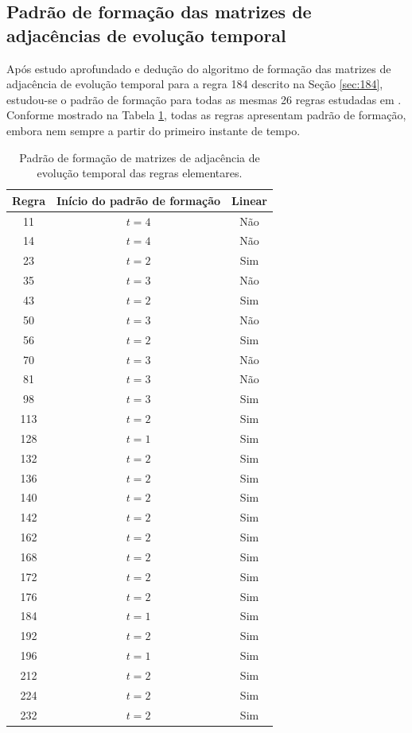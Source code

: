 \documentclass[12pt,a4paper]{article}
\begin{document}
\subsection{Padrão de formação das matrizes de adjacências de evolução temporal}\label{sec:pattern}

Após estudo aprofundado e dedução do algoritmo de formação das matrizes
de adjacência de evolução temporal para a regra 184 descrito na Seção \ref{sec:184},
estudou-se o padrão de formação para todas as mesmas 26 regras estudadas em
. Conforme mostrado na Tabela \ref{tab:pattern},
todas as regras apresentam padrão de formação, embora nem sempre a
partir do primeiro instante de tempo.

\begin{table}[htp]
\begin{center}
\begin{tabular}{c c c}
\hline
\textbf{Regra} & \textbf{Início do padrão de formação} & \textbf{Linear}\\ \hline
 11 & $t=4$ & Não \\
 14 & $t=4$ & Não \\
 23 & $t=2$ & Sim \\
 35 & $t=3$ & Não \\
 43 & $t=2$ & Sim \\
 50 & $t=3$ & Não \\
 56 & $t=2$ & Sim \\
 70 & $t=3$ & Não \\
 81 & $t=3$ & Não \\
 98 & $t=3$ & Sim \\
113 & $t=2$ & Sim \\
128 & $t=1$ & Sim \\
132 & $t=2$ & Sim \\
136 & $t=2$ & Sim \\
140 & $t=2$ & Sim \\
142 & $t=2$ & Sim \\
162 & $t=2$ & Sim \\
168 & $t=2$ & Sim \\
172 & $t=2$ & Sim \\
176 & $t=2$ & Sim \\
184 & $t=1$ & Sim \\
192 & $t=2$ & Sim \\
196 & $t=1$ & Sim \\
212 & $t=2$ & Sim \\
224 & $t=2$ & Sim \\
232 & $t=2$ & Sim \\
\end{tabular}
\caption{Padrão de formação de matrizes de adjacência de evolução temporal das
regras elementares.}
\label{tab:pattern}
\end{center}
\end{table}
\end{document}
